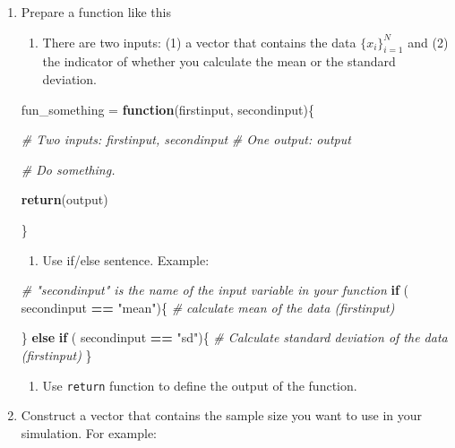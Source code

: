 \documentclass[]{book}
\newenvironment{Shaded}{\begin{snugshade}}{\end{snugshade}}
\newcommand{\KeywordTok}[1]{\textcolor[rgb]{0.13,0.29,0.53}{\textbf{#1}}}
\newcommand{\StringTok}[1]{\textcolor[rgb]{0.31,0.60,0.02}{#1}}
\newcommand{\CommentTok}[1]{\textcolor[rgb]{0.56,0.35,0.01}{\textit{#1}}}
\newcommand{\ControlFlowTok}[1]{\textcolor[rgb]{0.13,0.29,0.53}{\textbf{#1}}}
\newcommand{\OperatorTok}[1]{\textcolor[rgb]{0.81,0.36,0.00}{\textbf{#1}}}
\newcommand{\NormalTok}[1]{#1}
\providecommand{\tightlist}{%
  \setlength{\itemsep}{0pt}\setlength{\parskip}{0pt}}
\begin{document}
\begin{enumerate}
\def\labelenumi{\arabic{enumi}.}
\tightlist
\item
  Prepare a function like this

  \begin{enumerate}
  \def\labelenumii{\arabic{enumii}.}
  \tightlist
  \item
    There are two inputs: (1) a vector that contains the data
    \(\{x_{i}\}_{i=1}^{N}\) and (2) the indicator of whether you
    calculate the mean or the standard deviation.
  \end{enumerate}

\begin{Shaded}
\begin{Highlighting}[]
\NormalTok{fun_something =}\StringTok{ }\ControlFlowTok{function}\NormalTok{(firstinput, secondinput)\{}

  \CommentTok{# Two inputs: firstinput, secondinput}
  \CommentTok{# One output: output}

  \CommentTok{# Do something.}

  \KeywordTok{return}\NormalTok{(output)}

\NormalTok{\}}
\end{Highlighting}
\end{Shaded}

  \begin{enumerate}
  \def\labelenumii{\arabic{enumii}.}
  \setcounter{enumii}{1}
  \tightlist
  \item
    Use if/else sentence. Example:
  \end{enumerate}

\begin{Shaded}
\begin{Highlighting}[]
\CommentTok{# "secondinput" is the name of the input variable in your function}
\ControlFlowTok{if}\NormalTok{ ( secondinput }\OperatorTok{==}\StringTok{ "mean"}\NormalTok{)\{}
  \CommentTok{# calculate mean of the data (firstinput)}

\NormalTok{\} }\ControlFlowTok{else} \ControlFlowTok{if}\NormalTok{ ( secondinput }\OperatorTok{==}\StringTok{ "sd"}\NormalTok{)\{}
  \CommentTok{# Calculate standard deviation of the data (firstinput) }
\NormalTok{\}    }
\end{Highlighting}
\end{Shaded}

  \begin{enumerate}
  \def\labelenumii{\arabic{enumii}.}
  \setcounter{enumii}{2}
  \tightlist
  \item
    Use \texttt{return} function to define the output of the function.
  \end{enumerate}
\item
  Construct a vector that contains the sample size you want to use in
  your simulation. For example:
\end{enumerate}
\end{document}
